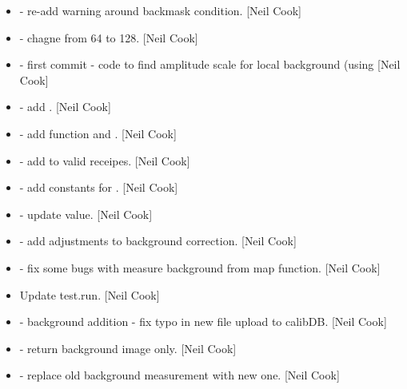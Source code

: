 \documentclass[a4paper,10pt,english]{report}
\begin{document}
\begin{itemize}
\item {} 
 - re-add warning around backmask condition. {[}Neil Cook{]}

\item {} 
 - chagne  from 64 to 128.
{[}Neil Cook{]}

\item {} 
 - first commit - code to find amplitude scale
for local background (using  {[}Neil Cook{]}

\item {} 
 - add . {[}Neil Cook{]}

\item {} 
 - add function  and
. {[}Neil Cook{]}

\item {} 
 - add  to valid receipes. {[}Neil
Cook{]}

\item {} 
 - add constants for .
{[}Neil Cook{]}

\item {} 
 - update  value. {[}Neil Cook{]}

\item {} 
 - add adjustments to background correction. {[}Neil Cook{]}

\item {} 
 - fix some bugs with measure background from map
function. {[}Neil Cook{]}

\item {} 
Update test.run. {[}Neil Cook{]}

\item {} 
 - background addition - fix typo in new file
upload to calibDB. {[}Neil Cook{]}

\item {} 
 - return background image only. {[}Neil Cook{]}

\item {} 
 - replace old background measurement
with new one. {[}Neil Cook{]}


\end{itemize}
\end{document}
